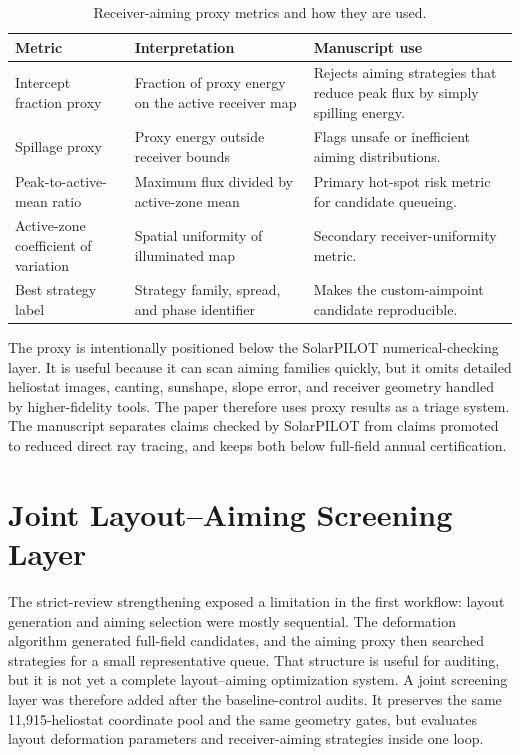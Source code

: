 \documentclass[final,3p,times]{elsarticle}
\begin{document}
\begin{table}[t]
\centering
\caption{Receiver-aiming proxy metrics and how they are used.}
\label{tab:proxy-metrics}
\small
\begin{tabular}{p{}p{}p{}}
\toprule
Metric & Interpretation & Manuscript use \\
\midrule
Intercept fraction proxy & Fraction of proxy energy on the active receiver map & Rejects aiming strategies that reduce peak flux by simply spilling energy. \\
Spillage proxy & Proxy energy outside receiver bounds & Flags unsafe or inefficient aiming distributions. \\
Peak-to-active-mean ratio & Maximum flux divided by active-zone mean & Primary hot-spot risk metric for candidate queueing. \\
Active-zone coefficient of variation & Spatial uniformity of illuminated map & Secondary receiver-uniformity metric. \\
Best strategy label & Strategy family, spread, and phase identifier & Makes the custom-aimpoint candidate reproducible. \\
\bottomrule
\end{tabular}
\end{table}

The proxy is intentionally positioned below the SolarPILOT numerical-checking layer. It is useful because it can scan aiming families quickly, but it omits detailed heliostat images, canting, sunshape, slope error, and receiver geometry handled by higher-fidelity tools. The paper therefore uses proxy results as a triage system. The manuscript separates claims checked by SolarPILOT from claims promoted to reduced direct ray tracing, and keeps both below full-field annual certification.

\section{Joint Layout--Aiming Screening Layer}
The strict-review strengthening exposed a limitation in the first workflow: layout generation and aiming selection were mostly sequential. The deformation algorithm generated full-field candidates, and the aiming proxy then searched strategies for a small representative queue. That structure is useful for auditing, but it is not yet a complete layout--aiming optimization system. A joint screening layer was therefore added after the baseline-control audits. It preserves the same 11,915-heliostat coordinate pool and the same geometry gates, but evaluates layout deformation parameters and receiver-aiming strategies inside one loop.
\end{document}
